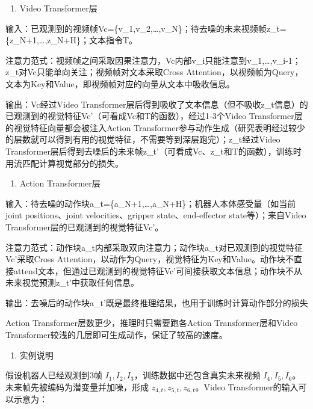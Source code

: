 \begin{enumerate}
\def\labelenumi{\arabic{enumi}.}
\tightlist
\item
  Video Transformer层
\end{enumerate}

输入：已观测到的视频帧Vc=\{v\_1,v\_2,\ldots,v\_N\}；待去噪的未来视频帧z\_t=\{z\_N+1,\ldots,z\_N+H\}；文本指令T。

注意力范式：视频帧之间采取因果注意力，Vc内部v\_i只能注意到v\_1,\ldots,v\_i-1；z\_t对Vc只能单向关注；视频帧对文本采取Cross Attention，以视频帧为Query，文本为Key和Value，即视频帧对应的向量从文本中吸收信息。

输出：Vc经过Video Transformer层后得到吸收了文本信息（但不吸收z\_t信息）的已观测到的视觉特征Vc'（可看成Vc和T的函数），经过1-3个Video Transformer层的视觉特征向量都会被注入Action Transformer参与动作生成（研究表明经过较少的层数就可以得到有用的视觉特征，不需要等到深层跑完）；z\_t经过Video Transformer层后得到去噪后的未来帧z\_t'（可看成Vc、z\_t和T的函数），训练时用流匹配计算视觉部分的损失。

\begin{enumerate}
\def\labelenumi{\arabic{enumi}.}
\setcounter{enumi}{1}
\tightlist
\item
  Action Transformer层
\end{enumerate}

输入：待去噪的动作块a\_t=\{a\_N+1,\ldots,a\_N+H\}；机器人本体感受量（如当前joint positions、joint velocities、gripper state、end-effector state等）；来自Video Transformer层的已观测到的视觉特征Vc'。

注意力范式：动作块a\_t内部采取双向注意力；动作块a\_t对已观测到的视觉特征Vc'采取Cross Attention，以动作为Query，视觉特征为Key和Value。动作块不直接attend文本，但通过已观测到的视觉特征Vc'可间接获取文本信息；动作块不从未来视觉预测z\_t'中获取任何信息。

输出：去噪后的动作块a\_t'既是最终推理结果，也用于训练时计算动作部分的损失

Action Transformer层数更少，推理时只需要跑各Action Transformer层和Video Transformer较浅的几层即可生成动作，保证了较高的速度。

\begin{enumerate}
\def\labelenumi{\arabic{enumi}.}
\setcounter{enumi}{2}
\tightlist
\item
  实例说明
\end{enumerate}

假设机器人已经观测到3帧 \(I_1,I_2,I_3\)，训练数据中还包含真实未来视频 \(I_4,I_5,I_6\)。未来帧先被编码为潜变量并加噪，形成 \(z_{4,t},z_{5,t},z_{6,t}\)。Video Transformer的输入可以示意为：

